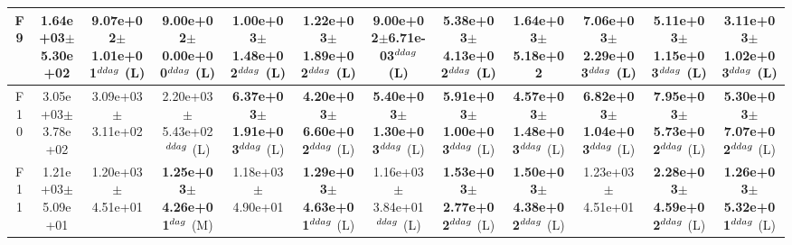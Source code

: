\begin{table}[!t]
\begin{tabular}{c|ccccccccccc}
F9  & 1.64e+03$\pm$5.30e+02  & 9.07e+02$\pm$1.01e+01$^{\\ddag}$ (L)  & 9.00e+02$\pm$0.00e+00$^{\\ddag}$ (L)  & 1.00e+03$\pm$1.48e+02$^{\\ddag}$ (L)  & 1.22e+03$\pm$1.89e+02$^{\\ddag}$ (L)  & 9.00e+02$\pm$6.71e-03$^{\\ddag}$ (L)  & \textbf{5.38e+03$\pm$4.13e+02}$^{\\ddag}$ (L)  & 1.64e+03$\pm$5.18e+02   & \textbf{7.06e+03$\pm$2.29e+03}$^{\\ddag}$ (L)  & \textbf{5.11e+03$\pm$1.15e+03}$^{\\ddag}$ (L)  & \textbf{3.11e+03$\pm$1.02e+03}$^{\\ddag}$ (L) \\ \hline
F10  & 3.05e+03$\pm$3.78e+02  & 3.09e+03$\pm$3.11e+02   & 2.20e+03$\pm$5.43e+02$^{\\ddag}$ (L)  & \textbf{6.37e+03$\pm$1.91e+03}$^{\\ddag}$ (L)  & \textbf{4.20e+03$\pm$6.60e+02}$^{\\ddag}$ (L)  & \textbf{5.40e+03$\pm$1.30e+03}$^{\\ddag}$ (L)  & \textbf{5.91e+03$\pm$1.00e+03}$^{\\ddag}$ (L)  & \textbf{4.57e+03$\pm$1.48e+03}$^{\\ddag}$ (L)  & \textbf{6.82e+03$\pm$1.04e+03}$^{\\ddag}$ (L)  & \textbf{7.95e+03$\pm$5.73e+02}$^{\\ddag}$ (L)  & \textbf{5.30e+03$\pm$7.07e+02}$^{\\ddag}$ (L) \\ \hline
F11  & 1.21e+03$\pm$5.09e+01  & 1.20e+03$\pm$4.51e+01   & \textbf{1.25e+03$\pm$4.26e+01}$^{\\dag}$ (M)  & 1.18e+03$\pm$4.90e+01   & \textbf{1.29e+03$\pm$4.63e+01}$^{\\ddag}$ (L)  & 1.16e+03$\pm$3.84e+01$^{\\ddag}$ (L)  & \textbf{1.53e+03$\pm$2.77e+02}$^{\\ddag}$ (L)  & \textbf{1.50e+03$\pm$4.38e+02}$^{\\ddag}$ (L)  & 1.23e+03$\pm$4.51e+01   & \textbf{2.28e+03$\pm$4.59e+02}$^{\\ddag}$ (L)  & \textbf{1.26e+03$\pm$5.32e+01}$^{\\ddag}$ (L) \\ \hline

\end{tabular}
\end{table}
